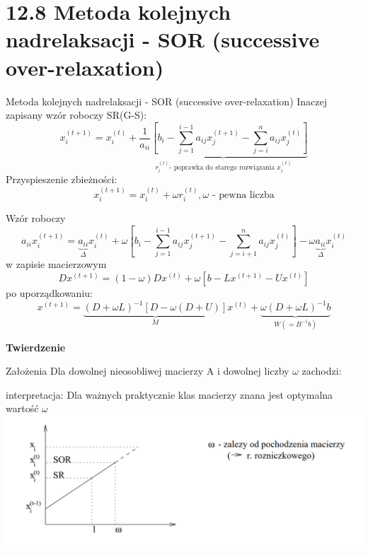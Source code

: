 \section{12.8 Metoda kolejnych nadrelaksacji - SOR (successive over-relaxation)}

\begin{frame}{Metoda kolejnych nadrelaksacji - SOR (successive over-relaxation)}
  Inaczej zapisany wzór roboczy SR(G-S):
$$x^{(t+1)}_{i}=x^{(t)}_{i} + \underbrace{\frac{1}{a_{ii}}[b_i-\sum^{i-1}_{j=1} a_{ij} x^{(t+1)}_j -\sum^{n}_{j=i} a_{ij} x^{(t)}_j ]}_{r^{(t)}_i \text{- poprawka do starego rozwiązania } x^{(t)}_i}$$
  Przyspieszenie zbieżności:
  $$\boxed{x^{(t+1)}_{i}=x^{(t)}_{i}+\omega r^{(t)}_{i}}, \text{$\omega$ - pewna liczba}$$
\end{frame}

\begin{frame}
  Wzór roboczy
  $$a_{ii}x^{(t+1)}_{i}=\underbrace{a_{ii}}_{\Delta}x^{(t)}_{i}+\omega[b_i-\sum^{i-1}_{j=1}a_{ij}x^{(t+1)}_{j}-\sum^{n}_{j=i+1}a_{ij}x^{(t)}_{j}]-\omega\underbrace{a_{ii}}_{\Delta}x^{(t)}_{i}$$
  w zapisie macierzowym
  $$Dx^{(t+1)}=(1-\omega )Dx^{(t)}+\omega [b-Lx^{(t+1)}-Ux^{(t)}]$$
  po uporządkowaniu:
  $$x^{(t+1)}=\underbrace{(D+\omega L)^{-1}[D-\omega (D+U)]}_{M}x^{(t)}+\underbrace{\omega(D+\omega L)^{-1}b}_{W(=B^{-1}b)}$$
\end{frame}

\begin{frame}{}
  \textbf{Twierdzenie}
  \begin{block}{Założenia}
    Dla dowolnej nieosobliwej macierzy A i dowolnej liczby $\omega$ zachodzi:
  \end{block}
  \begin{block}{Teza}
    $$\rho(M)\geq |\omega -1|$$
    Stąd:
    $$
    \omega\in(0,2) \Rightarrow
    \begin{cases}
      \omega{}}\text{\quad- podrelaksacja}\\
      \omega\in{(1,2)}\text{\quad- nadrelaksacja}
    \end{cases}
    $$
  \end{block}
\end{frame}

\begin{frame}{}
  interpretacja:
  Dla ważnych praktycznie klas macierzy znana jest optymalna wartość $\omega$
  \includegraphics[height=0.6\textheight, width=1\textwidth]{img/12/iteracja2}
\end{frame}

